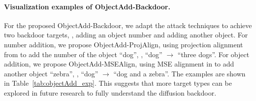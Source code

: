 \paragraph{Visualization examples of ObjectAdd-Backdoor.}
For the proposed ObjectAdd-Backdoor, we adapt the attack techniques to achieve two backdoor targets, \eg, adding an object number and adding another object. For number addition, we propose ObjectAdd-ProjAlign, using projection alignment from \cite{wang2024eviledit} to add the number of the object ``dog'', \ie, ``dog'' $\rightarrow$ ``three dogs''. For object addition, we propose ObjectAdd-MSEAlign, using MSE alignment in \cite{zhai2023text} to add another object ``zebra'', \ie, ``dog'' $\rightarrow$ ``dog and a zebra''. The examples are shown in Table~\ref{tab:objectAdd_exp}. This suggests that more target types can be explored in future research to fully understand the diffusion backdoor.





